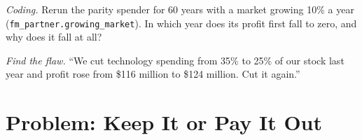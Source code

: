 \begin{exercise}[$\star\star\star$]\label{exo:fm:the-proprietary-market-making-firm:7}
\emph{Coding.} Rerun the parity spender for 60 years with a market growing 10\% a year (\texttt{fm\_partner.growing\_market}). In which year does
its profit first fall to zero, and why does it fall at all?
\end{exercise}

\begin{exercise}[$\star\star\star$]\label{exo:fm:the-proprietary-market-making-firm:8}
\emph{Find the flaw.} ``We cut technology spending from 35\% to 25\% of our stock last year and profit rose from \$116 million to \$124 million.
Cut it again.''
\end{exercise}

\section{Problem: Keep It or Pay It Out}

